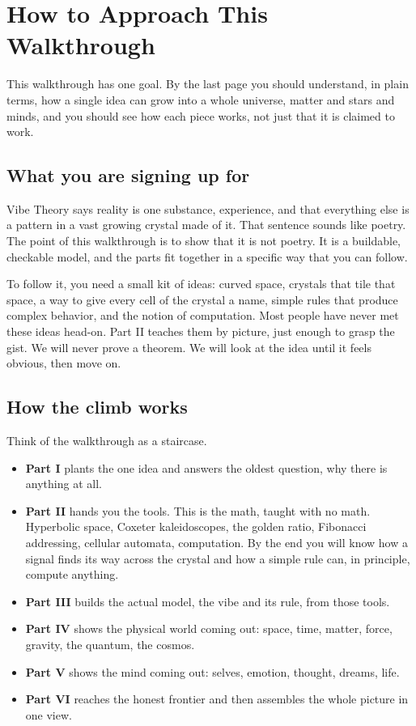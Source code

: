 \section{How to Approach This Walkthrough}

This walkthrough has one goal. By the last page you should understand, in plain terms, how a single idea can grow into a whole universe, matter and stars and minds, and you should see how each piece works, not just that it is claimed to work.

\subsection{What you are signing up for}

Vibe Theory says reality is one substance, experience, and that everything else is a pattern in a vast growing crystal made of it. That sentence sounds like poetry. The point of this walkthrough is to show that it is not poetry. It is a buildable, checkable model, and the parts fit together in a specific way that you can follow.

To follow it, you need a small kit of ideas: curved space, crystals that tile that space, a way to give every cell of the crystal a name, simple rules that produce complex behavior, and the notion of computation. Most people have never met these ideas head-on. Part II teaches them by picture, just enough to grasp the gist. We will never prove a theorem. We will look at the idea until it feels obvious, then move on.

\subsection{How the climb works}

Think of the walkthrough as a staircase.

\begin{itemize}
\item \textbf{Part I} plants the one idea and answers the oldest question, why there is anything at all.
\item \textbf{Part II} hands you the tools. This is the math, taught with no math. Hyperbolic space, Coxeter kaleidoscopes, the golden ratio, Fibonacci addressing, cellular automata, computation. By the end you will know how a signal finds its way across the crystal and how a simple rule can, in principle, compute anything.
\item \textbf{Part III} builds the actual model, the vibe and its rule, from those tools.
\item \textbf{Part IV} shows the physical world coming out: space, time, matter, force, gravity, the quantum, the cosmos.
\item \textbf{Part V} shows the mind coming out: selves, emotion, thought, dreams, life.
\item \textbf{Part VI} reaches the honest frontier and then assembles the whole picture in one view.
\end{itemize}


